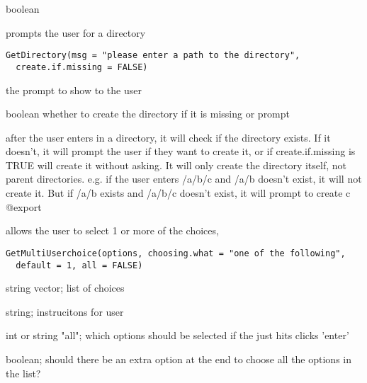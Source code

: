 \documentclass[a4paper]{book}
\begin{document}
%
\begin{Value}
boolean
\end{Value}
%
\begin{Description}\relax
prompts the user for a directory
\end{Description}
%
\begin{Usage}
\begin{verbatim}
GetDirectory(msg = "please enter a path to the directory",
  create.if.missing = FALSE)
\end{verbatim}
\end{Usage}
%
\begin{Arguments}
\begin{ldescription}
\item[\code{msg}] the prompt to show to the user

\item[\code{create.if.missing}] boolean whether to create the directory if it is missing or prompt
\end{ldescription}
\end{Arguments}
%
\begin{Details}\relax
after the user enters in a directory, it will check if the directory exists.
If it doesn't, it will prompt the user if they want to create it, or if create.if.missing is TRUE
will create it without asking. It will only create the directory itself, not parent directories.
e.g. if the user enters /a/b/c and /a/b doesn't exist, it will not create it. But if /a/b exists and
/a/b/c doesn't exist, it will prompt to create c
@export
\end{Details}
%
\begin{Description}\relax
allows the user to select 1 or more of the choices,
\end{Description}
%
\begin{Usage}
\begin{verbatim}
GetMultiUserchoice(options, choosing.what = "one of the following",
  default = 1, all = FALSE)
\end{verbatim}
\end{Usage}
%
\begin{Arguments}
\begin{ldescription}
\item[\code{options}] string vector; list of choices

\item[\code{choosing.what}] string; instrucitons for user

\item[\code{default}] int or string "all"; which options should be selected if the just hits clicks 'enter'

\item[\code{all}] boolean; should there be an extra option at the end to choose all the options in the list?
\end{ldescription}
\end{Arguments}
\end{document}
